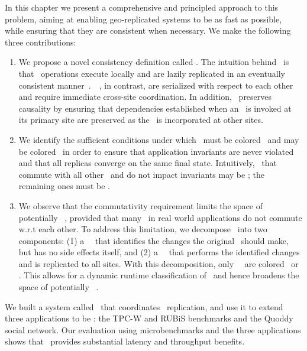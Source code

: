 In this chapter we present a comprehensive and principled approach to
this problem, aiming at enabling geo-replicated systems to be as fast
as possible, while ensuring that they are consistent when necessary. We make the following three contributions:
\begin{enumerate}
\item 
We propose a novel consistency definition called \RBc. The intuition
behind \RBc\ is that \blue\ operations execute locally and are lazily
replicated in an eventually consistent manner~\cite{Decandia2007Dynamo,Lloyd2011Causal,Terry1995Managing,
Mahajan2010Depot,Feldman2010Sporc,Shapiro2011Conflict,Singh2009Zeno}.\ \Red\ \operations, in contrast, are serialized with respect to each
other and require immediate cross-site coordination. In addition,
\RBc\ preserves
causality by ensuring that dependencies established when an
\operation\ is  invoked at its primary site are preserved as
the \operation\ is incorporated at other sites.

\item We identify the sufficient conditions under which \operations\ must be
  colored \red\ and may be colored \blue\ in order to ensure that
  application invariants are never violated and that all replicas
  converge on the same final state.  Intuitively, \operations\ that
  commute with all other \operations\ and do not impact invariants may
  be \blue; the remaining ones must be \red.


\item We observe that the commutativity requirement limits the space
  of potentially \blue\ \operations, provided that many \operations\ in real world applications
do not commute w.r.t each other. To address this limitation, we decompose \operations\ into two
  components: (1) a \initial\ \operation\ that identifies the changes
  the original \operation\ should make, but has no side effects
  itself, and (2) a \shadow\ \operation\ that performs the identified
  changes and is replicated to all sites. With this decomposition, only
  \shadow\ \operations\ are colored \red\ or \blue. This allows for a
  dynamic runtime classification of \operations\ and hence broadens the space
  of potentially \blue\ \operations.
\end{enumerate}

We built a system called \gemini\ that coordinates
\RedBlue\ replication, and use it to extend three applications to be
\RBct: the TPC-W and RUBiS benchmarks and the Quoddy social network.  Our evaluation using microbenchmarks and the three
applications shows that \RBc\ provides substantial latency and
throughput benefits.

